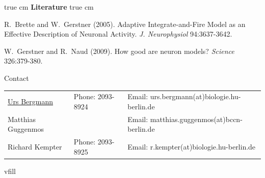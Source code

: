 \documentclass[12pt]{article}
\begin{document}
 true cm
{\bf Literature}
 true cm

R.~Brette and W.~Gerstner (2005). Adaptive Integrate-and-Fire Model as an
Effective Description of Neuronal Activity.
\emph{J. Neurophysiol} 94:3637-3642.\newline

W.~Gerstner and R.~Naud (2009). How good are neuron models?
\emph{Science} 326:379-380.\newline

\vfill
\centerline{\CAP Contact}
\CAP

\begin{tabular}{lll}
\underline{Urs Bergmann} & Phone: 2093-8924 & Email:
urs.bergmann(at)biologie.hu-berlin.de \\
Matthias Guggenmos & & Email: matthias.guggenmos(at)bccn-berlin.de \\
Richard Kempter \hfill & Phone: 2093-8925 \hfill & Email:
r.kempter(at)biologie.hu-berlin.de \\
\end{tabular}vfill
\end{document}
